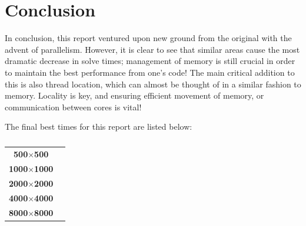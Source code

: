 \documentclass[11pt,twocolumn,a4paper]{article}
\begin{document}
\section{Conclusion}
In conclusion, this report ventured upon new ground from the original with the advent of parallelism. However, it is clear to see that similar areas cause the most dramatic decrease in solve times; management of memory is still crucial in order to maintain the best performance from one's code! The main critical addition to this is also thread location, which can almost be thought of in a similar fashion to memory. Locality is key, and ensuring efficient movement of memory, or communication between cores is vital! \par

The final best times for this report are listed below: \par

\vspace{-0.2cm}
\begin{table}[h]
\begin{adjustwidth}{-0.15cm}{}
\small
\centering
\begin{tabular}{c|c}
\textbf{500$\times$500}   &  \\
\textbf{1000$\times$1000} &  \\
\textbf{2000$\times$2000} &  \\
\textbf{4000$\times$4000} &  \\
\textbf{8000$\times$8000} &

\end{tabular}
\caption{}
\label{finalResults}
\end{adjustwidth}
\end{table}\par
\vspace{-0.22cm}

\end{document}
